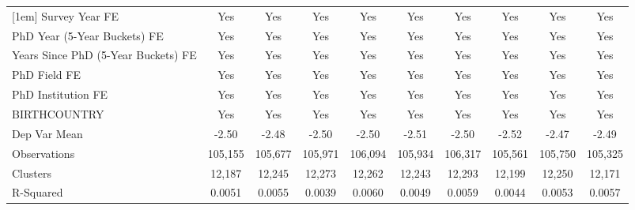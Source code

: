 \begin{table}[htbp]
\begin{tabular}{l*{9}{c}}
[1em]
Survey Year FE&         Yes         &         Yes         &         Yes         &         Yes         &         Yes         &         Yes         &         Yes         &         Yes         &         Yes         \\
[1em]
PhD Year (5-Year Buckets) FE&         Yes         &         Yes         &         Yes         &         Yes         &         Yes         &         Yes         &         Yes         &         Yes         &         Yes         \\
[1em]
Years Since PhD (5-Year Buckets) FE&         Yes         &         Yes         &         Yes         &         Yes         &         Yes         &         Yes         &         Yes         &         Yes         &         Yes         \\
[1em]
PhD Field FE&         Yes         &         Yes         &         Yes         &         Yes         &         Yes         &         Yes         &         Yes         &         Yes         &         Yes         \\
[1em]
PhD Institution FE&         Yes         &         Yes         &         Yes         &         Yes         &         Yes         &         Yes         &         Yes         &         Yes         &         Yes         \\
[1em]
BIRTHCOUNTRY&         Yes         &         Yes         &         Yes         &         Yes         &         Yes         &         Yes         &         Yes         &         Yes         &         Yes         \\
\hline
Dep Var Mean&       -2.50         &       -2.48         &       -2.50         &       -2.50         &       -2.51         &       -2.50         &       -2.52         &       -2.47         &       -2.49         \\
Observations&     105,155         &     105,677         &     105,971         &     106,094         &     105,934         &     106,317         &     105,561         &     105,750         &     105,325         \\
Clusters&      12,187         &      12,245         &      12,273         &      12,262         &      12,243         &      12,293         &      12,199         &      12,250         &      12,171         \\
R-Squared&      0.0051         &      0.0055         &      0.0039         &      0.0060         &      0.0049         &      0.0059         &      0.0044         &      0.0053         &      0.0057         \\

\end{tabular}
\end{table}
